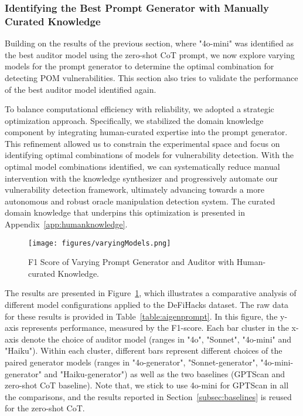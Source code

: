 \subsubsection{Identifying the Best Prompt Generator with Manually Curated Knowledge}

Building on the results of the previous section, where "4o-mini" was identified as the best auditor model using the zero-shot CoT prompt, we now explore varying models for the prompt generator to determine the optimal combination for detecting POM vulnerabilities. This section also tries to validate the performance of the best auditor model identified again.

To balance computational efficiency with reliability, we adopted a strategic optimization approach.
Specifically, we stabilized the domain knowledge component by integrating human-curated expertise into the prompt generator. This refinement allowed us to constrain the experimental space and focus on identifying optimal combinations of models for vulnerability detection.
With the optimal model combinations identified, we can systematically reduce manual intervention with the knowledge synthesizer and progressively automate our vulnerability detection framework, ultimately advancing towards a more autonomous and robust oracle manipulation detection system.
The curated domain knowledge that underpins this optimization is presented in Appendix~\ref{app:humanknowledge}.



\begin{figure}[h]
  \centering
  \texttt{[image: figures/varyingModels.png]}
  \caption{F1 Score of Varying Prompt Generator and Auditor with Human-curated Knowledge.}
  \label{fig:varymodel}
\end{figure}

The results are presented in Figure~\ref{fig:varymodel}, which illustrates a comparative analysis of different model configurations applied to the DeFiHacks dataset. The raw data for these results is provided in Table~\ref{table:aigenprompt}.
In this figure, the y-axis represents performance, measured by the F1-score. 
Each bar cluster in the x-axis denote the choice of auditor model (ranges in "4o", "Sonnet", "4o-mini" and "Haiku").
Within each cluster, different bars represent different choices of the paired generator models (ranges in "4o-generator", "Sonnet-generator", "4o-mini-generator" and "Haiku-generator") as well as the two baselines (GPTScan and zero-shot CoT baseline).
Note that, we stick to use 4o-mini for GPTScan in all the comparisons, and the results reported in Section~\ref{subsec:baselines} is reused for the zero-shot CoT.




